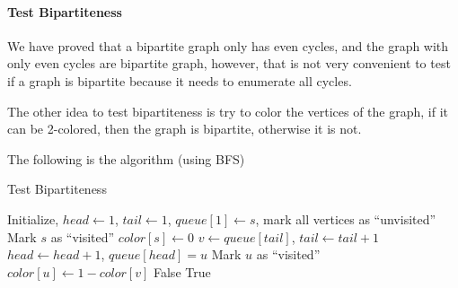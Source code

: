                 \paragraph{Test Bipartiteness}
                    We have proved that a bipartite graph only has even cycles, and the graph with only even cycles are bipartite graph, however, that is not very convenient to test if a graph is bipartite because it needs to enumerate all cycles.

                    The other idea to test bipartiteness is try to color the vertices of the graph, if it can be 2-colored, then the graph is bipartite, otherwise it is not.

                    The following is the algorithm (using BFS)
                    \begin{algorithm}[H]
                        \caption{Test Bipartiteness}
                        \begin{algorithmic}[1]
                            \State Initialize, $head \gets 1$, $tail \gets 1$, $queue[1] \gets s$, mark all vertices as ``unvisited''
                            \State Mark $s$ as ``visited''
                            \State $color[s] \gets 0$
                                \State $v \gets queue[tail]$, $tail \gets tail + 1$
                                        \State $head \gets head + 1$, $queue[head] = u$
                                        \State Mark $u$ as ``visited''
                                        \State $color[u] \gets 1 - color[v]$
                                    \Else
                                            \Return False
                                        \EndIf
                                    \EndIf
                                \EndFor
                            \EndWhile
                            \Return True
                        \end{algorithmic}
                    \end{algorithm}

